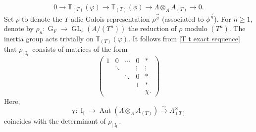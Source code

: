 \documentclass[11pt]{amsart}
\newcommand{\fl}{\mathfrak{l}}
\newcommand{\op}[1]{\operatorname{#1}}
\numberwithin{equation}{section}
\begin{document}
\begin{equation}\label{T t exact sequence}0\rightarrow \mathbb{T}_{(T)}(\varphi) \rightarrow \mathbb{T}_{(T)}(\phi)\rightarrow \Lambda\otimes_{A} A_{(T)}\rightarrow 0.\end{equation}
Set $\rho$ to denote the $T$-adic Galois representation $\rho^{\vec{g}}$ (associated to $\phi^{\vec{g}}$). For $n\geq 1$, denote by $\rho_n:\op{G}_F\rightarrow \op{GL}_r\left(A/(T^n)\right)$ the reduction of $\rho$ modulo $(T^n)$. The inertia group acts trivially on $\mathbb{T}_{(T)}(\varphi)$. It follows from \eqref{T t exact sequence} that $\rho_{|\op{I}_{\mathfrak{l}}}$ consists of matrices of the form 
\[\left(\begin{array}{ccccc}1 & 0 & \cdots & 0 & \ast \\ & \ddots &  & \vdots & \vdots \\ &  & \ddots & 0 & \ast \\ &  &  & 1 &  \ast \\ &  &  & &  \chi. \end{array}\right)\]
 Here, \[\chi:\op{I}_{\fl}\rightarrow \op{Aut}(\Lambda\otimes_{A} A_{(T)})\xrightarrow{\sim} A_{(T)}^\times\] coincides with the determinant of $\rho_{|\op{I}_{\mathfrak{l}}}$.
\end{document}
